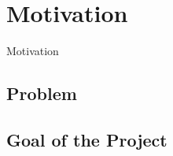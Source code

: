 \section{Motivation}
\begin{frame}
	\begin{center}
	\huge{Motivation}
	\end{center}
\end{frame}

\subsection*{Problem}


\subsection*{Goal of the Project}



